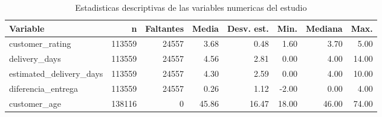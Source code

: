 \begin{table}[htbp]
\centering
\caption{Estadisticas descriptivas de las variables numericas del estudio}
\label{tab:descriptivas}
\begin{tabular}{lrrrrrrr}
\toprule
Variable & n & Faltantes & Media & Desv. est. & Min. & Mediana & Max. \\
\midrule
customer\_rating & 113559 & 24557 & 3.68 & 0.48 & 1.60 & 3.70 & 5.00 \\
delivery\_days & 113559 & 24557 & 4.56 & 2.81 & 0.00 & 4.00 & 14.00 \\
estimated\_delivery\_days & 113559 & 24557 & 4.30 & 2.59 & 0.00 & 4.00 & 10.00 \\
diferencia\_entrega & 113559 & 24557 & 0.26 & 1.12 & -2.00 & 0.00 & 4.00 \\
customer\_age & 138116 & 0 & 45.86 & 16.47 & 18.00 & 46.00 & 74.00 \\
\bottomrule
\end{tabular}
\end{table}
